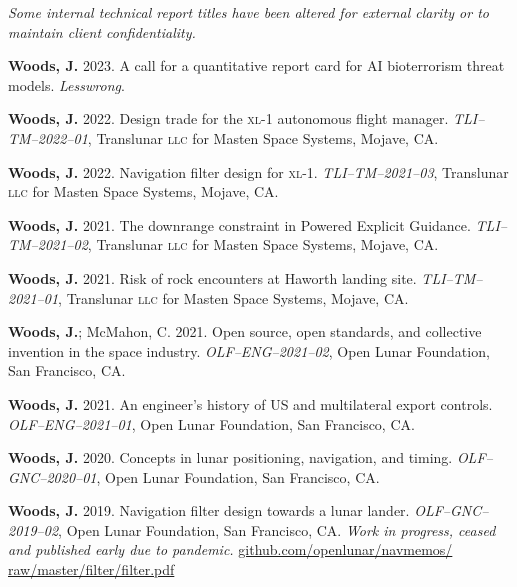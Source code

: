 \documentclass[12pt,letterpaper]{article}
\newcommand{\mhead}[1]{\leavevmode\marginpar{\sffamily\footnotesize #1}}
\begin{document}
\bigskip
\mhead{Technical \newline Reports}%
\par\vspace{-\baselineskip}\textit{Some internal technical report titles have been altered for external clarity or to maintain client confidentiality.}

\medskip
\par\textbf{Woods, J.} 2023. A call for a quantitative report card for AI bioterrorism threat models. \textit{Lesswrong}.

\medskip
\par\textbf{Woods, J.} 2022. Design trade for the \textsc{xl}-1 autonomous flight manager. \textit{TLI--TM--2022--01}, Translunar \textsc{llc} for Masten Space Systems, Mojave, CA.

\medskip
\par\textbf{Woods, J.} 2022. Navigation filter design for \textsc{xl}-1. \textit{TLI--TM--2021--03}, Translunar \textsc{llc} for Masten Space Systems, Mojave, CA.

\medskip
\par\textbf{Woods, J.} 2021. The downrange constraint in Powered Explicit Guidance. \textit{TLI--TM--2021--02}, Translunar \textsc{llc} for Masten Space Systems, Mojave, CA.

\medskip
\par\textbf{Woods, J.} 2021. Risk of rock encounters at Haworth landing site. \textit{TLI--TM--2021--01}, Translunar \textsc{llc} for Masten Space Systems, Mojave, CA.

\medskip
\par\textbf{Woods, J.}; McMahon, C. 2021. Open source, open standards, and collective invention in the space industry. \textit{OLF--ENG--2021--02}, Open Lunar Foundation, San Francisco, CA.

\medskip
\par\textbf{Woods, J.} 2021. An engineer's history of US and multilateral export controls. \textit{OLF--ENG--2021--01}, Open Lunar Foundation, San Francisco, CA.

\medskip
\par\textbf{Woods, J.} 2020. Concepts in lunar positioning, navigation, and timing. \textit{OLF--GNC--2020--01}, Open Lunar Foundation, San Francisco, CA.

\medskip
\par\textbf{Woods, J.} 2019. Navigation filter design towards a lunar lander. \textit{OLF--GNC--2019--02}, Open Lunar Foundation, San Francisco, CA. \textit{Work in progress, ceased and published early due to pandemic.} \href{https://github.com/openlunar/navmemos/raw/master/filter/filter.pdf}{github.com/openlunar/navmemos/ raw/master/filter/filter.pdf}
\end{document}
